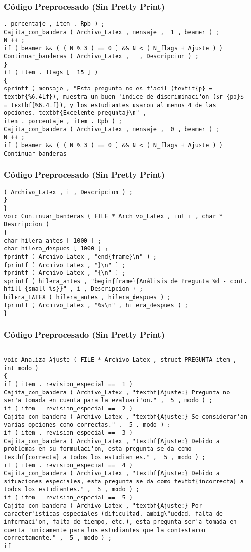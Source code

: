\documentclass{beamer}
\begin{document}
\begin{frame}[fragile]
\frametitle{C\'odigo Preprocesado (Sin Pretty Print)}
\begin{lstlisting}[style=CStyle]
. porcentaje , item . Rpb ) ; 
Cajita_con_bandera ( Archivo_Latex , mensaje ,  1 , beamer ) ; 
N ++ ; 
if ( beamer && ( ( N % 3 ) == 0 ) && N < ( N_flags + Ajuste ) ) 
Continuar_banderas ( Archivo_Latex , i , Descripcion ) ; 
} 
if ( item . flags [  15 ] ) 
{ 
sprintf ( mensaje , "Esta pregunta no es f'acil (textit{p} = textbf{%6.4Lf}), muestra un buen 'indice de discriminaci'on ($r_{pb}$ = textbf{%6.4Lf}), y los estudiantes usaron al menos 4 de las opciones. textbf{Excelente pregunta}\n" , 
item . porcentaje , item . Rpb ) ; 
Cajita_con_bandera ( Archivo_Latex , mensaje ,  0 , beamer ) ; 
N ++ ; 
if ( beamer && ( ( N % 3 ) == 0 ) && N < ( N_flags + Ajuste ) ) 
Continuar_banderas \end{lstlisting}
\end{frame}
\begin{frame}[fragile]
\frametitle{C\'odigo Preprocesado (Sin Pretty Print)}
\begin{lstlisting}[style=CStyle]
( Archivo_Latex , i , Descripcion ) ; 
} 
} 
void Continuar_banderas ( FILE * Archivo_Latex , int i , char * Descripcion ) 
{ 
char hilera_antes [ 1000 ] ; 
char hilera_despues [ 1000 ] ; 
fprintf ( Archivo_Latex , "end{frame}\n" ) ; 
fprintf ( Archivo_Latex , "}\n" ) ; 
fprintf ( Archivo_Latex , "{\n" ) ; 
sprintf ( hilera_antes , "begin{frame}{Análisis de Pregunta %d - cont. hfill {small %s}}" , i , Descripcion ) ; 
hilera_LATEX ( hilera_antes , hilera_despues ) ; 
fprintf ( Archivo_Latex , "%s\n" , hilera_despues ) ; 
} \end{lstlisting}
\end{frame}
\begin{frame}[fragile]
\frametitle{C\'odigo Preprocesado (Sin Pretty Print)}
\begin{lstlisting}[style=CStyle]

void Analiza_Ajuste ( FILE * Archivo_Latex , struct PREGUNTA item , int modo ) 
{ 
if ( item . revision_especial ==  1 ) 
Cajita_con_bandera ( Archivo_Latex , "textbf{Ajuste:} Pregunta no ser'a tomada en cuenta para la evaluaci'on." ,  5 , modo ) ; 
if ( item . revision_especial ==  2 ) 
Cajita_con_bandera ( Archivo_Latex , "textbf{Ajuste:} Se considerar'an varias opciones como correctas." ,  5 , modo ) ; 
if ( item . revision_especial ==  3 ) 
Cajita_con_bandera ( Archivo_Latex , "textbf{Ajuste:} Debido a problemas en su formulaci'on, esta pregunta se da como textbf{correcta} a todos los estudiantes." ,  5 , modo ) ; 
if ( item . revision_especial ==  4 ) 
Cajita_con_bandera ( Archivo_Latex , "textbf{Ajuste:} Debido a situaciones especiales, esta pregunta se da como textbf{incorrecta} a todos los estudiantes." ,  5 , modo ) ; 
if ( item . revision_especial ==  5 ) 
Cajita_con_bandera ( Archivo_Latex , "textbf{Ajuste:} Por caracter'isticas especiales (dificultad, ambig\"uedad, falta de informaci'on, falta de tiempo, etc.), esta pregunta ser'a tomada en cuenta 'unicamente para los estudiantes que la contestaron correctamente." ,  5 , modo ) ; 
if \end{lstlisting}
\end{frame}
\end{document}
